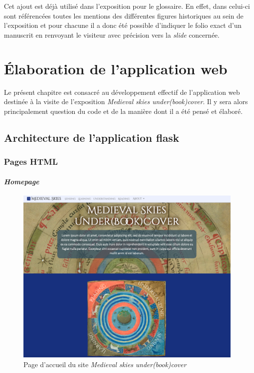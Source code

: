 	Cet ajout est déjà utilisé dans l'exposition pour le glossaire. En effet, dans celui-ci sont référencées toutes les mentions des différentes figures historiques au sein de l'exposition et pour chacune il a donc été possible d'indiquer le folio exact d'un manuscrit en renvoyant le visiteur avec précision vers la \textit{slide} concernée.

	
	\chapter{Élaboration de l’application web}
	Le présent chapitre est consacré au développement effectif de l'application web destinée à la visite de l'exposition \textit{Medieval skies under(book)cover}. Il y sera alors principalement question du code et de la manière dont il a été pensé et élaboré. 
	
	\section{Architecture de l’application flask}
	
    \subsection{Pages HTML}
    \subsubsection{\textit{Homepage}}
    \begin{figure}[h]
	\caption{Page d'accueil du site \textit{Medieval skies under(book)cover}}
	\includegraphics[scale=0.3, angle=0]{images/partie3/website/expo-homepage.png}
    \centering
    \end{figure}
    
